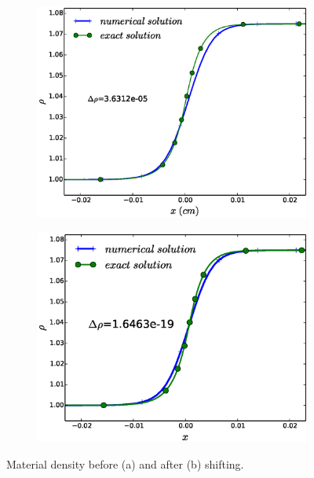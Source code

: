 \documentclass[times,doublespace]{fldauth}%
\begin{document}
\begin{figure}[h]
    \begin{subfigure}{0.5\textwidth}
    \centering
    \includegraphics[width=\linewidth]{figures/cst-xs/mach-1p05/mach-1p05-density-nel-50-zero-shift.eps}
    \caption{}\label{fig:mach-1p05-cst-xs-density-no-shift}
    \end{subfigure}
    \begin{subfigure}{0.5\textwidth}
    \centering
    \includegraphics[width=\linewidth]{figures/cst-xs/mach-1p05/mach-1p05-density-nel-50-plot.eps}
    \caption{}\label{fig:mach-1p05-cst-xs-density-with-shift}
    \end{subfigure}
    \caption{Material density before (a) and after (b) shifting.}\label{fig:mach-1p05-shift-vs-non-shift}
\end{figure}
\end{document}
